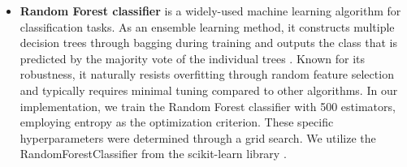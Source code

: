 \documentclass[gmd, manuscript]{copernicus}
\begin{document}
\begin{itemize}
    However, it is important to note that visual inspection of correlation plots between individual metadata values Figure~\ref{data_split} reveals rather fuzzy boundaries between clusters. This observation aligns with our expectations, given the diverse nature of urban, suburban, and rural locations across different countries, which can vary significantly in terms of industrial development, population density, and degree of urbanization in different countries \citep{zhang2024promoting}.
    \item  \textbf{Random Forest classifier}  is a widely-used machine learning algorithm for classification tasks. As an ensemble learning method, it constructs multiple decision trees through bagging during training and outputs the class that is predicted by the majority vote of the individual trees \citep{breiman2001random}. Known for its robustness, it naturally resists overfitting through random feature selection and typically requires minimal tuning compared to other algorithms.
    In our implementation, we train the Random Forest classifier with 500 estimators, employing entropy as the optimization criterion. These specific hyperparameters were determined through a grid search. We utilize the RandomForestClassifier from the scikit-learn library \citep{scikit-learn}.


\end{itemize}
\end{document}
